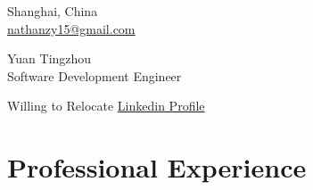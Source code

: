 \documentclass[a4,10pt]{article}
\newcommand{\hskills}[1]{
\textbf{\bfseries #1} }
\begin{document}
\begin{center}
    \begin{minipage}[b]{0.24\textwidth}
            \large Shanghai, China \\
            \large \href{mailto:nathanzy15@gmail.com}{nathanzy15@gmail.com} 
    \end{minipage}%
    \begin{minipage}[b]{0.5\textwidth}
            \centering
            {\HUGE Yuan Tingzhou} \\ %
            \vspace{0.1cm}
            {\color{UI_blue} \Large{Software Development Engineer}} \\
    \end{minipage}%
    \begin{minipage}[b]{0.24\textwidth}
            \flushright \large  Willing to Relocate
            {\href{https://www.linkedin.com/in/tingzhou-yuan-aa7718214/}{Linkedin Profile} } \\
    \end{minipage}   
    
\vspace{-0.15cm} 
{\color{UI_blue} \hrulefill}
\end{center}
\vspace{-0.2cm}
\section{Professional Experience}

        
\end{document}
